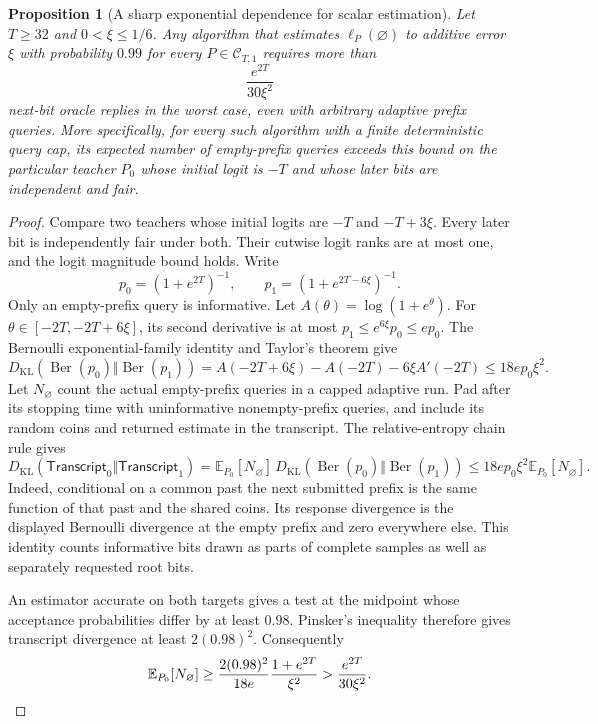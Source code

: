 \documentclass[11pt]{article}
\newcommand{\KL}{D_{\mathrm{KL}}}
\newcommand{\Ber}{\operatorname{Ber}}
\newtheorem{proposition}[theorem]{Proposition}
\theoremstyle{definition}
\theoremstyle{remark}
\begin{document}
\begin{proposition}[A sharp exponential dependence for scalar estimation]\label{prop:scalar}
Let $T\ge32$ and $0<\xi\le1/6$. Any algorithm that estimates $\ell_P(\varnothing)$ to additive error $\xi$ with probability $0.99$ for every $P\in\mathcal C_{T,1}$ requires more than
\[
\frac{e^{2T}}{30\xi^2}
\]
next-bit oracle replies in the worst case, even with arbitrary adaptive prefix queries.
More specifically, for every such algorithm with a finite deterministic query cap, its expected number of empty-prefix queries exceeds this bound on the particular teacher $P_0$ whose initial logit is $-T$ and whose later bits are independent and fair.
\end{proposition}
\begin{proof}
Compare two teachers whose initial logits are $-T$ and $-T+3\xi$. Every later bit is independently fair under both. Their cutwise logit ranks are at most one, and the logit magnitude bound holds. Write
\[
p_0=(1+e^{2T})^{-1},\qquad p_1=(1+e^{2T-6\xi})^{-1}.
\]
Only an empty-prefix query is informative. Let $A(\theta)=\log(1+e^\theta)$. For $\theta\in[-2T,-2T+6\xi]$, its second derivative is at most $p_1\le e^{6\xi}p_0\le ep_0$. The Bernoulli exponential-family identity and Taylor's theorem give
\[
\KL(\Ber(p_0)\Vert\Ber(p_1))
=A(-2T+6\xi)-A(-2T)-6\xi A'(-2T)
\le18ep_0\xi^2.
\]
Let $N_{\varnothing}$ count the actual empty-prefix queries in a capped adaptive run. Pad after its stopping time with uninformative nonempty-prefix queries, and include its random coins and returned estimate in the transcript. The relative-entropy chain rule gives
\[
\KL(\mathsf{Transcript}_0\Vert\mathsf{Transcript}_1)
=\mathbb E_{P_0}[N_{\varnothing}]\,
  \KL(\Ber(p_0)\Vert\Ber(p_1))
\le18ep_0\xi^2\mathbb E_{P_0}[N_{\varnothing}].
\]
Indeed, conditional on a common past the next submitted prefix is the same function of that past and the shared coins. Its response divergence is the displayed Bernoulli divergence at the empty prefix and zero everywhere else. This identity counts informative bits drawn as parts of complete samples as well as separately requested root bits.

An estimator accurate on both targets gives a test at the midpoint whose acceptance probabilities differ by at least $0.98$. Pinsker's inequality therefore gives transcript divergence at least $2(0.98)^2$. Consequently
\[
\mathbb E_{P_0}[N_{\varnothing}]
\ge\frac{2(0.98)^2}{18e}\frac{1+e^{2T}}{\xi^2}
>\frac{e^{2T}}{30\xi^2}.\qedhere
\]
\end{proof}
\end{document}

